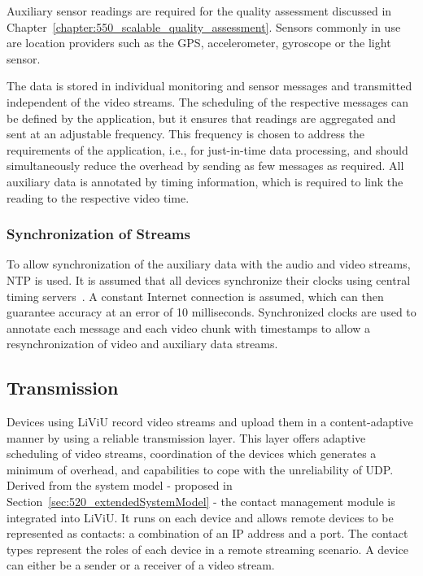 Auxiliary sensor readings are required for the quality assessment discussed in Chapter~\ref{chapter:550_scalable_quality_assessment}.
Sensors commonly in use are location providers such as the \ac{GPS}, accelerometer, gyroscope or the light sensor.

The data is stored in individual monitoring and sensor messages and transmitted independent of the video streams.
The scheduling of the respective messages can be defined by the application, but it ensures that readings are aggregated and sent at an adjustable frequency.
This frequency is chosen to address the requirements of the application, i.e., for just-in-time data processing, and should simultaneously reduce the overhead by sending as few messages as required.
All auxiliary data is annotated by timing information, which is required to link the reading to the respective video time.
\subsubsection{Synchronization of Streams}
To allow synchronization of the auxiliary data with the audio and video streams, \ac{NTP} is used.
It is assumed that all devices synchronize their clocks using central timing servers~\cite{rfc5905}. 
A constant Internet connection is assumed, which can then guarantee accuracy at an error of 10 milliseconds.
Synchronized clocks are used to annotate each message and each video chunk with timestamps to allow a resynchronization of video and auxiliary data streams. 
\subsection{Transmission}
\label{sec:522_Transmission}
Devices using \ac{LiViU} record video streams and upload them in a content-adaptive manner by using a reliable transmission layer.
This layer offers adaptive scheduling of video streams, coordination of the devices which generates a minimum of overhead, and capabilities to cope with the unreliability of \ac{UDP}.
Derived from the system model - proposed in Section~\ref{sec:520_extendedSystemModel} - the contact management module is integrated into \ac{LiViU}.
It runs on each device and allows remote devices to be represented as contacts: a combination of an \ac{IP} address and a port.
The contact types represent the roles of each device in a remote streaming scenario.
A device can either be a sender or a receiver of a video stream. 
